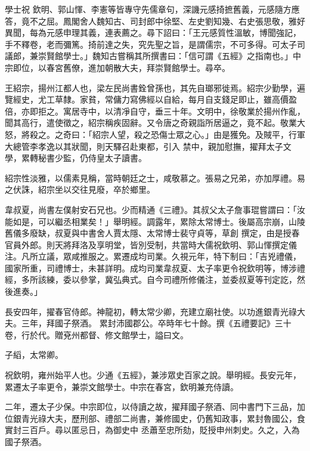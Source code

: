 \begin{pinyinscope}
 學士祝
 欽明、郭山惲、李憲等皆專守先儒章句，深譏元感掎摭舊義，元感隨方應答，竟不之屈。鳳閣舍人魏知古、司封郎中徐堅、左史劉知幾、右史張思敬，雅好異聞，每為元感申理其義，連表薦之。尋下詔曰：「王元感質性溫敏，博聞強記，手不釋卷，老而彌篤。掎前達之失，究先聖之旨，是謂儒宗，不可多得。可太子司議郎，兼崇賢館學士。」魏知古嘗稱其所撰書曰：「信可謂《五經》之指南也。」中宗即位，以春宮舊僚，進加朝散大夫，拜崇賢館學士。尋卒。



 王紹宗，揚州江都人也，梁左民尚書銓曾孫也，其先自瑯邪徙焉。紹宗少勤學，遍覽經史，尤工草隸。家貧，常傭力寫佛經以自給，每月自支錢足即止，雖高價盈倍，亦即拒之。寓居寺中，以清凈自守，垂三十年。文明中，徐敬業於揚州作亂，聞其高行，遣使徵之，紹宗稱疾固辭。又令唐之奇親詣所居逼之，竟不起。敬業大怒，將殺之。之奇曰：「紹宗人望，殺之恐傷士眾之心。」由是獲免。及賊平，行軍大總管李孝逸以其狀聞，則天驛召赴東都，引入
 禁中，親加慰撫，擢拜太子文學，累轉秘書少監，仍侍皇太子讀書。



 紹宗性淡雅，以儒素見稱，當時朝廷之士，咸敬慕之。張易之兄弟，亦加厚禮。易之伏誅，紹宗坐以交往見廢，卒於鄉里。



 韋叔夏，尚書左僕射安石兄也。少而精通《三禮》。其叔父太子詹事琨嘗謂曰：「汝能如是，可以繼丞相業矣！」舉明經。調露年，累除太常博士。後屬高宗崩，山陵舊儀多廢缺，叔夏與中書舍人賈太隱、太常博士裴守貞等，草創
 撰定，由是授春官員外郎。則天將拜洛及享明堂，皆別受制，共當時大儒祝欽明、郭山惲撰定儀注。凡所立議，眾咸推服之。累遷成均司業。久視元年，特下制曰：「吉兇禮儀，國家所重，司禮博士，未甚詳明。成均司業韋叔夏、太子率更令祝欽明等，博涉禮經，多所該練，委以參掌，冀弘典式。自今司禮所修儀注，並委叔夏等刊定訖，然後進奏。」



 長安四年，擢春官侍郎。神龍初，轉太常少卿，充建立廟社使。以功進銀青光祿大夫。三年，拜國子祭酒。
 累封沛國郡公。卒時年七十餘。撰《五禮要記》三十卷，行於代。贈兗州都督、修文館學士，謚曰文。



 子縚，太常卿。



 祝欽明，雍州始平人也。少通《五經》，兼涉眾史百家之說。舉明經。長安元年，累遷太子率更令，兼崇文館學士。中宗在春宮，欽明兼充侍讀。



 二年，遷太子少保。中宗即位，以侍讀之故，擢拜國子祭酒、同中書門下三品，加位銀青光祿大夫，歷刑部、禮部二尚書，兼修國史，仍舊知政事，累封魯國公，食實封三百戶。尋以匿忌日，為御史中
 丞蕭至忠所劾，貶授申州刺史。久之，入為國子祭酒。




\end{pinyinscope}
